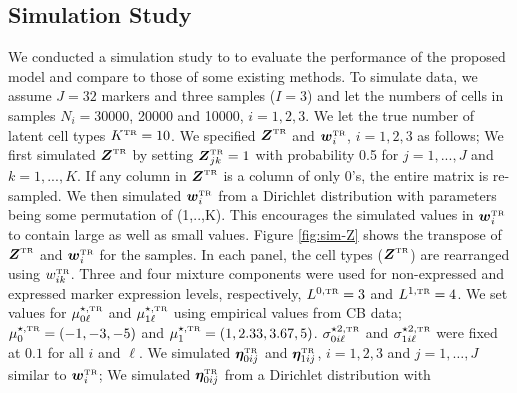 \documentclass[12pt,]{article}
\def\bet{\bm{\eta}}
\newcommand{\true}{{\mbox{\tiny TR}}}
\newcommand{\bZ}{\mbox{\boldmath $Z$}}
\newcommand{\bw}{\mbox{\boldmath $w$}}
\begin{document}
\subsection{Simulation Study}\label{sec:CB-sim} %
We conducted a simulation study to  to evaluate the performance of the proposed model and compare to those of some existing methods.
%
%
To simulate data, we assume $J=32$ markers and three samples ($I=3$) and let the numbers of cells in
samples $N_i=30000$, 20000 and 10000, $i=1, 2, 3$.
We let the true number of latent cell types $K^\true=10$.  We specified
$\bZ^\true$ and $\bw^\true_i$, $i=1,2,3$ as follows;
%
We first simulated $\bZ^\true$ by setting $\bZ^\true_{jk}=1$ with probability
0.5 for $j=1,...,J$ and $k=1,...,K$. If any column in $\bZ^\true$ is a column
of only 0's, the entire matrix is re-sampled.
We then simulated $\bw^\true_i$ from a Dirichlet distribution with parameters
being some permutation of (1,..,K). This encourages the simulated values
in $\bw^\true_i$ to contain large as well as small values.
%
Figure \ref{fig:sim-Z} shows the transpose of $\bZ^\true$ and $\bw^\true_i$ for
the samples. In each panel, the cell types ($\bZ^\true$) are rearranged using
$w_{ik}^\true$.  Three and four mixture components were used for non-expressed
and expressed marker expression levels, respectively, $L^{0, \true}=3$ and
$L^{1, \true}=4$. We set values for $\mu^{\star, \true}_{0\ell}$ and
$\mu^{\star, \true}_{1\ell}$ using empirical values from CB data; $\mu^{\star, \true}_{0} =
(-1, -3, -5)$ and $\mu^{\star, \true}_{1} = (1, 2.33, 3.67, 5)$. 
$\sigma^{\star 2, \true}_{0i\ell}$ and $\sigma^{\star 2,\true}_{1i\ell}$ were fixed at $0.1$ for all $i$ and $\ell$.
%
We simulated $\bet_{0ij}^\true$ and $\bet_{1ij}^\true$, $i=1,2,3$ and $j=1, \ldots, J$ similar to $\bw^\true_i$;
%
We simulated $\bet_{0ij}^\true$ from a Dirichlet distribution with
\end{document}
